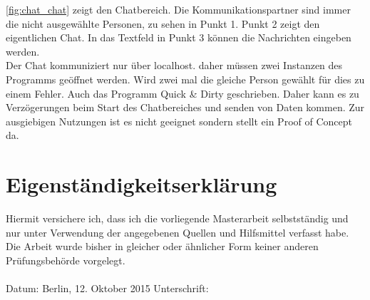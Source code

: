\documentclass[a4paper]{article}
\begin{document}
\begin{appendix}
	\autoref{fig:chat_chat} zeigt den Chatbereich. Die Kommunikationspartner
	sind immer die nicht ausgewählte Personen, zu sehen in Punkt 1. Punkt 2
	zeigt den eigentlichen Chat. In das Textfeld in Punkt 3 können die
	Nachrichten eingeben werden. \\
	
	
	Der Chat kommuniziert nur über localhost. daher müssen zwei Instanzen des
	Programms geöffnet werden. Wird zwei mal die gleiche Person gewählt für dies
	zu einem Fehler. Auch das Programm Quick \& Dirty geschrieben. Daher kann es
	zu Verzögerungen beim Start des Chatbereiches und senden von Daten kommen. Zur
	ausgiebigen Nutzungen ist es nicht geeignet sondern stellt ein
	Proof of Concept da.
	

	\newpage	
  	\section{Eigenständigkeitserklärung}
  	Hiermit versichere ich, dass ich die vorliegende Masterarbeit selbstständig und
  	nur unter Verwendung der angegebenen Quellen und Hilfsmittel verfasst habe. Die
  	Arbeit wurde bisher in gleicher oder ähnlicher Form keiner anderen
  	Prüfungsbehörde vorgelegt. \\ \\
  	
 	Datum: \hspace{10pt} Berlin, 12. Oktober 2015 \hspace{30pt} Unterschrift:

	\end{appendix}
  	
\end{document}
